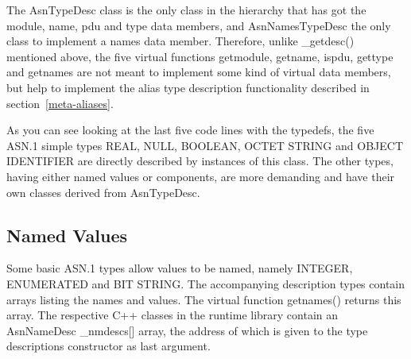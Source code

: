 The {\C AsnTypeDesc} class is the only class in the hierarchy that has got the {\C module}, {\C name}, {\C pdu} and {\C type} data members, and {\C AsnNamesTypeDesc} the only class to implement a {\C names} data member.
Therefore, unlike {\C \_getdesc()} mentioned above, the five virtual functions {\C getmodule}, {\C getname}, {\C ispdu}, {\C gettype} and {\C getnames} are not meant to implement some kind of virtual data members, but help to implement the alias type description functionality described in section~\ref{meta-aliases}.

As you can see looking at the last five code lines with the {\C typedef}s, the five ASN.1 simple types REAL, NULL, BOOLEAN, OCTET STRING and OBJECT IDENTIFIER are directly described by instances of this class.
The other types, having either named values or components, are more demanding and have their own classes derived from {\C AsnTypeDesc}.

\subsection{Named Values}

Some basic ASN.1 types allow values to be named, namely INTEGER, ENUMERATED and BIT STRING.
The accompanying description types contain arrays listing the names and values.
The virtual function {\C getnames()} returns this array.
The respective C++ classes in the runtime library contain an {\C AsnNameDesc \_nmdescs[]} array, the address of which is given to the type descriptions constructor as last argument.

